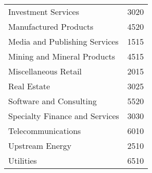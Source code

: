 \begin{tabular}{lr}
 Investment Services                               &                  3020 \\
 Manufactured Products                             &                  4520 \\
 Media and Publishing Services                     &                  1515 \\
 Mining and Mineral Products                       &                  4515 \\
 Miscellaneous Retail                              &                  2015 \\
 Real Estate                                       &                  3025 \\
 Software and Consulting                           &                  5520 \\
 Specialty Finance and Services                    &                  3030 \\
 Telecommunications                                &                  6010 \\
 Upstream Energy                                   &                  2510 \\
 Utilities                                         &                  6510 \\
\hline
\end{tabular}